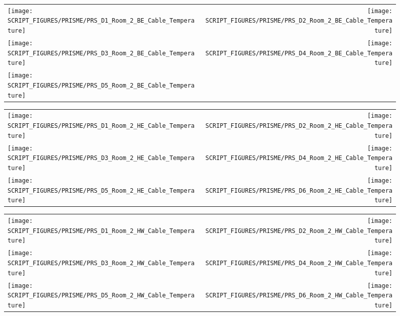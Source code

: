 \begin{figure}[p]
\begin{tabular*}{\textwidth}{l@{\extracolsep{\fill}}r}
\texttt{[image: SCRIPT\_FIGURES/PRISME/PRS\_D1\_Room\_2\_BE\_Cable\_Temperature]} &
\texttt{[image: SCRIPT\_FIGURES/PRISME/PRS\_D2\_Room\_2\_BE\_Cable\_Temperature]} \\
\texttt{[image: SCRIPT\_FIGURES/PRISME/PRS\_D3\_Room\_2\_BE\_Cable\_Temperature]} &
\texttt{[image: SCRIPT\_FIGURES/PRISME/PRS\_D4\_Room\_2\_BE\_Cable\_Temperature]} \\
\texttt{[image: SCRIPT\_FIGURES/PRISME/PRS\_D5\_Room\_2\_BE\_Cable\_Temperature]} &

\end{tabular*}
\label{PRISME_BE_Cable_Room_2}
\end{figure}

\begin{figure}[p]
\begin{tabular*}{\textwidth}{l@{\extracolsep{\fill}}r}
\texttt{[image: SCRIPT\_FIGURES/PRISME/PRS\_D1\_Room\_2\_HE\_Cable\_Temperature]} &
\texttt{[image: SCRIPT\_FIGURES/PRISME/PRS\_D2\_Room\_2\_HE\_Cable\_Temperature]} \\
\texttt{[image: SCRIPT\_FIGURES/PRISME/PRS\_D3\_Room\_2\_HE\_Cable\_Temperature]} &
\texttt{[image: SCRIPT\_FIGURES/PRISME/PRS\_D4\_Room\_2\_HE\_Cable\_Temperature]} \\
\texttt{[image: SCRIPT\_FIGURES/PRISME/PRS\_D5\_Room\_2\_HE\_Cable\_Temperature]} &
\texttt{[image: SCRIPT\_FIGURES/PRISME/PRS\_D6\_Room\_2\_HE\_Cable\_Temperature]}
\end{tabular*}
\label{PRISME_HE_Cable_Room_2}
\end{figure}

\begin{figure}[p]
\begin{tabular*}{\textwidth}{l@{\extracolsep{\fill}}r}
\texttt{[image: SCRIPT\_FIGURES/PRISME/PRS\_D1\_Room\_2\_HW\_Cable\_Temperature]} &
\texttt{[image: SCRIPT\_FIGURES/PRISME/PRS\_D2\_Room\_2\_HW\_Cable\_Temperature]} \\
\texttt{[image: SCRIPT\_FIGURES/PRISME/PRS\_D3\_Room\_2\_HW\_Cable\_Temperature]} &
\texttt{[image: SCRIPT\_FIGURES/PRISME/PRS\_D4\_Room\_2\_HW\_Cable\_Temperature]} \\
\texttt{[image: SCRIPT\_FIGURES/PRISME/PRS\_D5\_Room\_2\_HW\_Cable\_Temperature]} &
\texttt{[image: SCRIPT\_FIGURES/PRISME/PRS\_D6\_Room\_2\_HW\_Cable\_Temperature]}
\end{tabular*}
\label{PRISME_HW_Cable_Room_2}
\end{figure}

